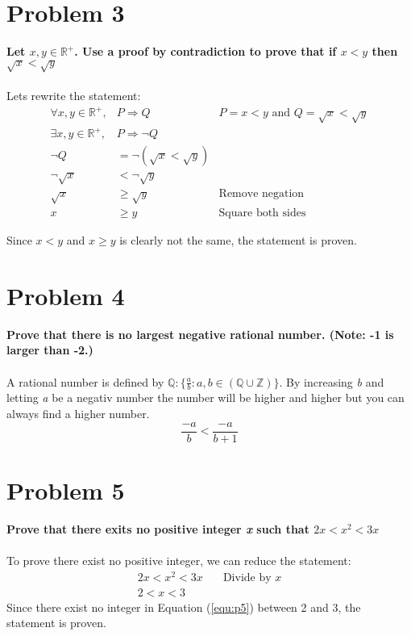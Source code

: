 \documentclass[english,10pt,a4paper]{article}
\begin{document}
\section*{Problem 3}
\textbf{Let $x, y \in \mathbb{R}^{+}$. Use a proof by contradiction to prove that if $x<y$ then $\sqrt{x} < \sqrt{y}$}
\\
\\
Lets rewrite the statement:
\begin{align}
\forall x, y \in \mathbb{R}^+, &P \Rightarrow Q & P = x < y \text{ and } Q = \sqrt{x}<\sqrt{y} \\
\exists x, y \in \mathbb{R}^+, &P \Rightarrow \neg Q \\
\neg Q &= \neg(\sqrt{x} < \sqrt{y})\\
\neg\sqrt{x} &< \neg \sqrt{y} \\
\sqrt{x} &\geq \sqrt{y} & \text{Remove negation}\\
x &\geq y & \text{Square both sides}
\end{align}

Since $x<y$ and $x\geq y$ is clearly not the same, the statement is proven.


\section*{Problem 4}
\textbf{Prove that there is no largest negative rational number. (Note: -1 is larger than -2.)}
\\
\\
A rational number is defined by $\mathbb{Q}: \{ \frac{a}{b}:a, b \in (\mathbb{Q} \cup \mathbb{Z})\}$.
By increasing \textit{b} and letting \textit{a} be a negativ number the number will be higher and higher but you can always find a higher number.
\[ \dfrac{-a}{b} < \dfrac{-a}{b+1}\]



\section*{Problem 5}
\textbf{Prove that there exits no positive integer \textit{x} such that $2x < x^2 < 3x$}
\\
\\
To prove there exist no positive integer, we can reduce the statement:
\begin{align}
2x < x^2 < 3x & \quad \text{Divide by } x\\
2 < x < 3 \label{equ:p5}
\end{align}
Since there exist no integer in Equation (\ref{equ:p5}) between 2 and 3, the statement is proven.
\end{document}
